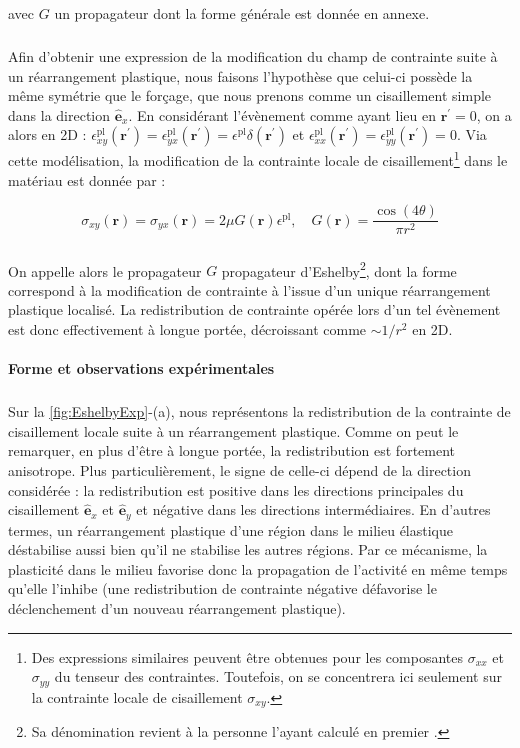 \noindent avec $G$ un propagateur dont la forme générale est donnée en annexe.

\subparagraph{}Afin d'obtenir une expression de la modification du champ de contrainte suite à un réarrangement plastique, nous faisons l'hypothèse que celui-ci possède la même symétrie que le forçage, que nous prenons comme un cisaillement simple dans la direction $\hat{\mathbf{e}}_x$. En considérant l'évènement comme ayant lieu en $\mathbf{r}^\prime = 0$, on a alors en 2D : $\epsilon_{xy}^\text{pl}(\mathbf{r}^\prime) = \epsilon_{yx}^\text{pl}(\mathbf{r}^\prime) = \epsilon^\text{pl}\delta(\mathbf{r}^\prime)$ et $\epsilon_{xx}^\text{pl}(\mathbf{r}^\prime) = \epsilon_{yy}^\text{pl}(\mathbf{r}^\prime) = 0$. Via cette modélisation, la modification de la contrainte locale de cisaillement\footnote{Des expressions similaires peuvent être obtenues pour les composantes $\sigma_{xx}$ et $\sigma_{yy}$ du tenseur des contraintes. Toutefois, on se concentrera ici seulement sur la contrainte locale de cisaillement $\sigma_{xy}$.} dans le matériau est donnée par :

\begin{equation}
	\sigma_{xy}(\mathbf{r})= \sigma_{yx}(\mathbf{r}) = 2\mu G(\mathbf{r}) \epsilon^\text{pl}, \quad G(\mathbf{r}) = \frac{\cos (4\theta)}{\pi r^2}
\end{equation}

\subparagraph{}On appelle alors le propagateur $G$ propagateur d'Eshelby\footnote{Sa dénomination revient à la personne l'ayant calculé en premier \cite{eshelby_determination_1997}.}, dont la forme correspond à la modification de contrainte à l'issue d'un unique réarrangement plastique localisé. La redistribution de contrainte opérée lors d'un tel évènement est donc effectivement à longue portée, décroissant comme $\sim 1/r^2$ en 2D.

\paragraph{Forme et observations expérimentales}

\subparagraph{}Sur la \autoref{fig:EshelbyExp}-(a), nous représentons la redistribution de la contrainte de cisaillement locale suite à un réarrangement plastique. Comme on peut le remarquer, en plus d'être à longue portée, la redistribution est fortement anisotrope. Plus particulièrement, le signe de celle-ci dépend de la direction considérée : la redistribution est positive dans les directions principales du cisaillement $\hat{\mathbf{e}}_x$ et $\hat{\mathbf{e}}_y$ et négative dans les directions intermédiaires. En d'autres termes, un réarrangement plastique d'une région dans le milieu élastique déstabilise aussi bien qu'il ne stabilise les autres régions. Par ce mécanisme, la plasticité dans le milieu favorise donc la propagation de l'activité en même temps qu'elle l'inhibe (une redistribution de contrainte négative défavorise le déclenchement d'un nouveau réarrangement plastique).

